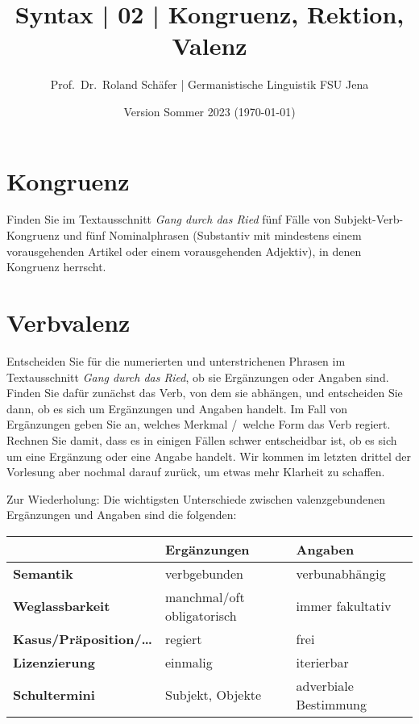 \documentclass[12pt,a4paper,twoside]{article}
\author{Prof.\ Dr.\ Roland Schäfer | Germanistische Linguistik FSU Jena}
\title{Syntax | 02 | Kongruenz, Rektion, Valenz}
\date{Version Sommer 2023 (\today)}
\newcommand{\Zeile}{\vspace{\baselineskip}}
\begin{document}
\maketitle

\section{Kongruenz}

Finden Sie im Textausschnitt \textit{Gang durch das Ried} fünf Fälle von Subjekt-Verb-Kongruenz und fünf Nominalphrasen (Substantiv mit mindestens einem vorausgehenden Artikel oder einem vorausgehenden Adjektiv), in denen Kongruenz herrscht.




\section{Verbvalenz}

Entscheiden Sie für die numerierten und unterstrichenen Phrasen im Textausschnitt \textit{Gang durch das Ried}, ob sie Ergänzungen oder Angaben sind.
Finden Sie dafür zunächst das Verb, von dem sie abhängen, und entscheiden Sie dann, ob es sich um Ergänzungen und Angaben handelt.
Im Fall von Ergänzungen geben Sie an, welches Merkmal \slash\ welche Form das Verb regiert.
Rechnen Sie damit, dass es in einigen Fällen schwer entscheidbar ist, ob es sich um eine Ergänzung oder eine Angabe handelt.
Wir kommen im letzten drittel der Vorlesung aber nochmal darauf zurück, um etwas mehr Klarheit zu schaffen.


Zur Wiederholung: Die wichtigsten Unterschiede zwischen valenzgebundenen Ergänzungen und Angaben sind die folgenden:

\Zeile

\begin{center}
  \begin{tabular}[h]{lll}
    \toprule
                         & \textbf{Ergänzungen} & \textbf{Angaben} \\
    \midrule
    \textbf{Semantik} & verbgebunden & verbunabhängig \\
    \textbf{Weglassbarkeit} & manchmal\slash oft obligatorisch & immer fakultativ \\
    \textbf{Kasus\slash Präposition\slash\ldots} & regiert & frei \\
    \textbf{Lizenzierung} & einmalig & iterierbar \\
    \midrule
    \textbf{Schultermini} & Subjekt, Objekte & adverbiale Bestimmung \\
    \bottomrule
  \end{tabular}
\end{center}
\end{document}

